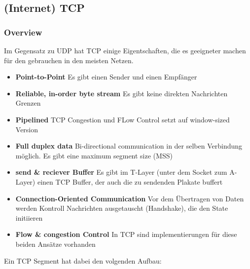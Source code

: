 	\subsection{(Internet) TCP}
		\subsubsection{Overview}
			Im Gegensatz zu UDP hat TCP einige Eigentschaften, die es geeigneter machen für den gebrauchen in den meisten Netzen. 
			\begin{itemize}
				\item \textbf{Point-to-Point} Es gibt einen Sender und einen Empfänger
				\item \textbf{Reliable, in-order byte stream} Es gibt keine direkten Nachrichten Grenzen
				\item \textbf{Pipelined} TCP Congestion und FLow Control setzt auf window-sized Version
				\item \textbf{Full duplex data} Bi-directional communication in der selben Verbindung möglich. Es gibt eine maximum segment size (MSS)
				\item \textbf{send \& reciever Buffer} Es gibt im T-Layer (unter dem Socket zum A-Layer) einen TCP Buffer, der auch die zu sendenden Plakate buffert
				\item \textbf{Connection-Oriented Communication} Vor dem Übertragen von Daten werden Kontroll Nachrichten ausgetauscht (Handshake), die den State initiieren
				\item \textbf{Flow \& congestion Control} In TCP sind implementierungen für diese beiden Ansätze vorhanden
			\end{itemize}
			Ein TCP Segment hat dabei den volgenden Aufbau:
